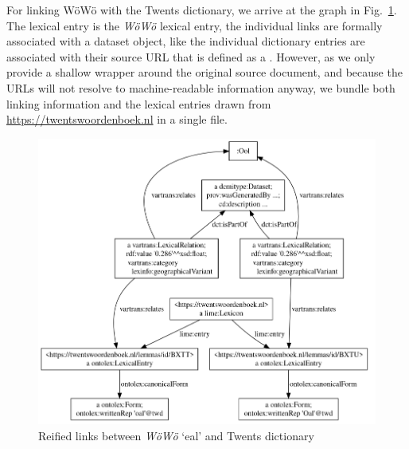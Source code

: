 For linking WöWö  with the Twents dictionary, we arrive at the graph in Fig.\ \ref{fig-links}. The lexical entry  is the \emph{WöWö} lexical entry, the individual links are formally associated with a dataset object, like the individual dictionary entries are associated with their source URL that is defined as a . However, as we only provide a shallow wrapper around the original source document, and because the URLs will not resolve to machine-readable information anyway, we bundle both linking information and the lexical entries drawn from \url{https://twentswoordenboek.nl} in a single file.

\begin{figure}
    \centering
    \includegraphics[width=1.05\linewidth]{img/links-vis.png}
    \caption{Reified  links between \emph{WöWö}  `eal' and Twents dictionary}
    \label{fig-links}
\end{figure}

